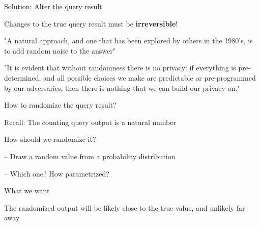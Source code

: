 \documentclass[12pt,aspectratio=169,handout]{beamer}
\begin{document}
\begin{frame}{Solution: Alter the query result}

Changes to the true query result must be \textbf{irreversible}!

"A natural approach, and one that has been explored by others in the 1980’s, is to add random noise to the answer" \citep{blumPracticalPrivacySuLQ2005}

"It is evident that without randomness there is no privacy: if everything is pre-determined, and all possible choices we make are predictable or pre-programmed by our adversaries, then there is nothing that we can build our privacy on." \citep{ekertUltimatePhysicalLimits2014} 

\end{frame}






\begin{frame}{How to randomize the query result?}

Recall: The counting query output is a natural number

How should we randomize it?

-- Draw a random value from a probability distribution

-- Which one? How parametrized?

\end{frame}





\begin{frame}{What we want}

The randomized output will be likely close to the true value, and unlikely far away


\end{frame}
\end{document}
